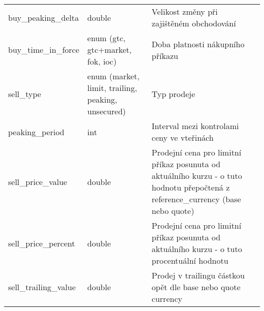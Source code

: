 \begin{center}
\begin{longtable}[h]{|l|C{4cm}|p{4cm}|}
        buy\_peaking\_delta                   & double                                                                                                                                                           & Velikost změny při zajištěném obchodování                                                                                         \\
        buy\_time\_in\_force                  & enum (gtc, gtc+market, fok, ioc)                                                                                                                                 & Doba platnosti nákupního příkazu                                                                                                  \\
        sell\_type                            & enum (market, limit, trailing, peaking, unsecured)                                                                                                               & Typ prodeje                                                                                                                       \\
        peaking\_period                       & int                                                                                                                                                              & Interval mezi kontrolami ceny ve vteřinách                                                                                        \\
        sell\_price\_value                    & double                                                                                                                                                           & Prodejní cena pro limitní příkaz posunuta od aktuálního kurzu - o tuto hodnotu přepočtená z reference\_currency (base nebo quote) \\
        sell\_price\_percent                  & double                                                                                                                                                           & Prodejní cena pro limitní příkaz posunuta od aktuálního kurzu - o tuto procentuální hodnotu                                       \\
        sell\_trailing\_value                 & double                                                                                                                                                           & Prodej v trailingu částkou opět dle base nebo quote currency                                                                      \\

\end{longtable}
\end{center}
